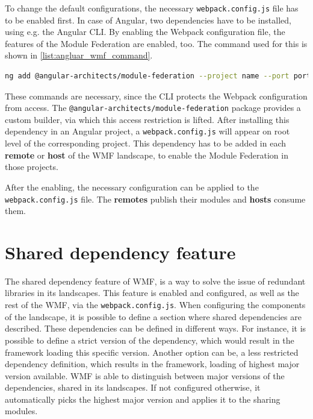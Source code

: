 To change the default configurations, the necessary \texttt{webpack.config.js} file has to be enabled first.
In case of Angular, two dependencies have to be installed, using e.g. the Angular CLI. By enabling the Webpack configuration file, the features of the Module Federation are enabled, too. The command used for this is shown in \ref{list:angluar_wmf_command}. 

\begin{lstlisting}[language=Bash, caption=Angular CLI console command to enable Module Federation in an Angular project, label=list:angluar_wmf_command,  xleftmargin=.0\textwidth, xrightmargin=.0\textwidth]
	ng add @angular-architects/module-federation --project name --port port
\end{lstlisting}

These commands are necessary, since the CLI protects the Webpack configuration from access. The \texttt{@angular-architects/module-federation} package provides a custom builder, via which this access restriction is lifted.
After installing this dependency in an Angular project, a \texttt{webpack.config.js} will appear on root level of the corresponding project.\cite{wmf_angular_dependency_install}
This dependency has to be added in each \textbf{remote} or \textbf{host} of the WMF landscape, to enable the Module Federation in those projects.

After the enabling, the necessary configuration can be applied to the \texttt{webpack.config.js} file. The \textbf{remotes} publish their modules and \textbf{hosts} consume them. 

\section{Shared dependency feature}

The shared dependency feature of WMF, is a way to solve the issue of redundant libraries in its landscapes.
This feature is enabled and configured, as well as the rest of the WMF, via the \texttt{webpack.config.js}. When configuring the components of the landscape, it is possible to define a section where shared dependencies are described. These dependencies can be defined in different ways. For instance, it is possible to define a strict version of the dependency, which would result in the framework loading this specific version. Another option can be, a less restricted dependency definition, which results in the framework, loading of highest major version available. WMF is able to distinguish between major versions of the dependencies, shared in its landscapes. If not configured otherwise, it automatically picks the highest major version and applies it to the sharing modules. 


